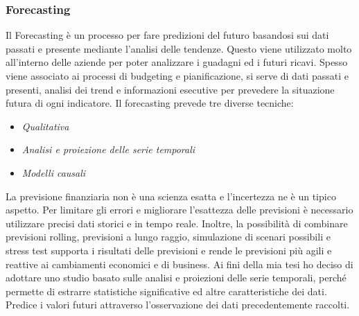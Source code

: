 \subsubsection{Forecasting}
Il Forecasting è un processo per fare predizioni del futuro basandosi sui dati passati e presente mediante l'analisi delle tendenze. Questo viene utilizzato molto all'interno delle aziende per poter analizzare i guadagni ed i futuri ricavi.
Spesso viene associato ai processi di budgeting e pianificazione, si serve di dati passati e presenti, analisi dei trend e informazioni esecutive per prevedere la situazione futura di ogni  indicatore.
Il forecasting prevede tre diverse tecniche:
\begin{itemize}
\item \textit{Qualitativa}
\item \textit{Analisi e proiezione delle serie temporali}
\item \textit{Modelli causali}
\end{itemize}
La previsione finanziaria non è una scienza esatta e l'incertezza ne è un tipico aspetto. Per limitare gli errori e migliorare l'esattezza delle previsioni è necessario utilizzare precisi dati storici e in tempo reale. Inoltre, la possibilità di combinare previsioni rolling, previsioni a lungo raggio, simulazione di scenari possibili e stress test supporta i risultati delle previsioni e rende le previsioni più agili e reattive ai cambiamenti economici e di business.
Ai fini della mia tesi ho deciso di adottare uno studio basato sulle analisi e proiezioni delle serie temporali, perché permette di estrarre statistiche significative ed altre caratteristiche dei dati. Predice i valori futuri attraverso l'osservazione dei dati precedentemente raccolti.




